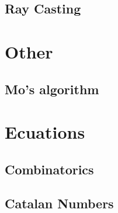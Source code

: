 \subsection{Ray Casting}

\section{Other}
\subsection{Mo's algorithm}

\section{Ecuations}
\subsection{Combinatorics}

\subsection{Catalan Numbers}





